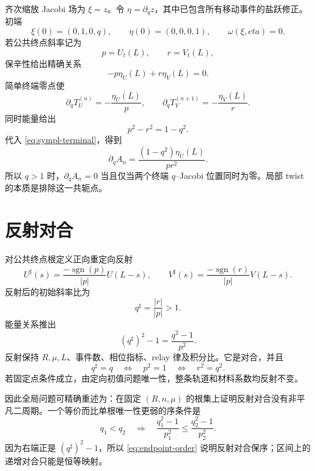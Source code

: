 \documentclass[UTF8,12pt,openany,fontset=fandol]{ctexrep}
\theoremstyle{definition}
\newcommand{\sgn}{\operatorname{sgn}}
\begin{document}
齐次缩放 Jacobi 场为 $\xi=z$。令 $\eta=\partial_qz$，其中已包含所有移动事件的盐跃修正。初端
\begin{equation}
 \xi(0)=(0,1,0,q),\qquad \eta(0)=(0,0,0,1),\qquad
 \omega(\xi,eta)=0.
\end{equation}
若公共终点斜率记为
\begin{equation}
 p=U_t(L),\qquad r=V_t(L),
\end{equation}
保辛性给出精确关系
\begin{equation}\label{eq:sympl-terminal}
 -p\eta_U(L)+r\eta_V(L)=0.
\end{equation}
简单终端零点使
\begin{equation}
 \partial_qT_U^{(n)}=-\frac{\eta_U(L)}p,\qquad
 \partial_qT_V^{(n+1)}=-\frac{\eta_V(L)}r.
\end{equation}
同时能量给出
\begin{equation}
 p^2-r^2=1-q^2.
\end{equation}
代入 \eqref{eq:sympl-terminal}，得到
\begin{equation}\label{eq:Aderivative}
 \partial_qA_n=\frac{(1-q^2)\eta_U(L)}{pr^2}.
\end{equation}
所以 $q>1$ 时，$\partial_qA_n=0$ 当且仅当两个终端 $q$--Jacobi 位置同时为零。局部 twist 的本质是排除这一共轭点。

\section{反射对合}

对公共终点根定义正向重定向反射
\begin{equation}
 U^\sharp(s)=\frac{-\sgn(p)}{|p|}U(L-s),\qquad
 V^\sharp(s)=\frac{-\sgn(r)}{|p|}V(L-s).
\end{equation}
反射后的初始斜率比为
\begin{equation}
 q^\sharp=\frac{|r|}{|p|}>1.
\end{equation}
能量关系推出
\begin{equation}\label{eq:qsharp}
 (q^\sharp)^2-1=\frac{q^2-1}{p^2}.
\end{equation}
反射保持 $R,\mu,L$、事件数、相位指标、relay 律及积分比。它是对合，并且
\begin{equation}\label{eq:fixedpoint}
 q^\sharp=q\quad\Longleftrightarrow\quad p^2=1
 \quad\Longleftrightarrow\quad r^2=q^2.
\end{equation}
若固定点条件成立，由定向初值问题唯一性，整条轨道和材料系数均反射不变。

因此全局问题可精确重述为：在固定 $(R,n,\mu)$ 的根集上证明反射对合没有非平凡二周期。一个等价而比单根唯一性更弱的序条件是
\begin{equation}\label{eq:endpoint-order}
 q_1<q_2\quad\Longrightarrow\quad
 \frac{q_1^2-1}{p_1^2}\le\frac{q_2^2-1}{p_2^2}.
\end{equation}
因为右端正是 $(q^\sharp)^2-1$，所以 \eqref{eq:endpoint-order} 说明反射对合保序；区间上的递增对合只能是恒等映射。
\end{document}
